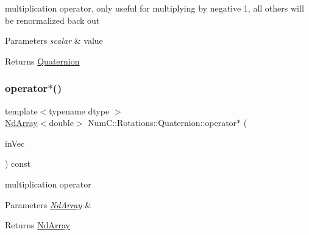 multiplication operator, only useful for multiplying by negative 1, all others will be renormalized back out


\begin{DoxyParams}{Parameters}
{\em scalar} & value \\
\hline
\end{DoxyParams}
\begin{DoxyReturn}{Returns}
\mbox{\hyperlink{class_num_c_1_1_rotations_1_1_quaternion}{Quaternion}} 
\end{DoxyReturn}
\mbox{\label{class_num_c_1_1_rotations_1_1_quaternion_a868fc0fae2cbd21d84b59b566fd88aeb}} 
\subsubsection{\texorpdfstring{operator$\ast$()}{operator*()}\hspace{0.1cm}{\footnotesize\ttfamily [3/3]}}
{\footnotesize\ttfamily template$<$typename dtype $>$ \\
\mbox{\hyperlink{class_num_c_1_1_nd_array}{Nd\+Array}}$<$double$>$ Num\+C\+::\+Rotations\+::\+Quaternion\+::operator$\ast$ (\begin{DoxyParamCaption}\item[{const \mbox{\hyperlink{class_num_c_1_1_nd_array}{Nd\+Array}}$<$ dtype $>$ \&}]{in\+Vec }\end{DoxyParamCaption}) const\hspace{0.3cm}{\ttfamily [inline]}}

multiplication operator


\begin{DoxyParams}{Parameters}
{\em \mbox{\hyperlink{class_num_c_1_1_nd_array}{Nd\+Array}}} & \\
\hline
\end{DoxyParams}
\begin{DoxyReturn}{Returns}
\mbox{\hyperlink{class_num_c_1_1_nd_array}{Nd\+Array}} 
\end{DoxyReturn}
\mbox{\label{class_num_c_1_1_rotations_1_1_quaternion_a4eecd15c68ff81468bbd549f662b5fe2}} 
